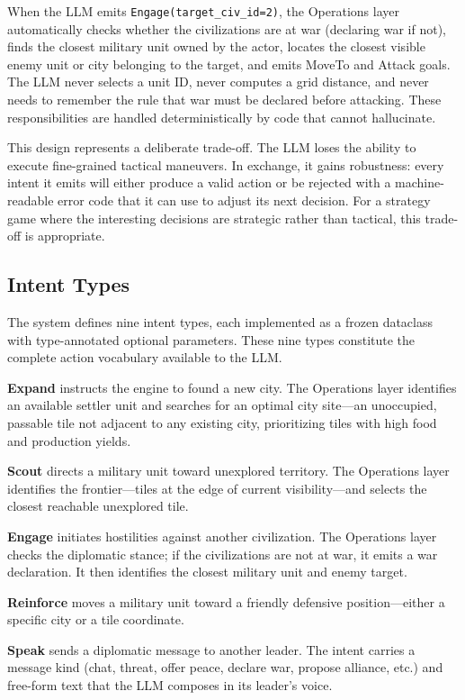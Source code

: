 \documentclass[conference]{IEEEtran}
\begin{document}
When the LLM emits \texttt{Engage(target\_civ\_id=2)}, the Operations layer
automatically checks whether the civilizations are at war (declaring war if
not), finds the closest military unit owned by the actor, locates the
closest visible enemy unit or city belonging to the target, and emits
MoveTo and Attack goals. The LLM never selects a unit ID, never computes a
grid distance, and never needs to remember the rule that war must be
declared before attacking. These responsibilities are handled
deterministically by code that cannot hallucinate.

This design represents a deliberate trade-off. The LLM loses the ability to
execute fine-grained tactical maneuvers. In exchange, it gains robustness:
every intent it emits will either produce a valid action or be rejected
with a machine-readable error code that it can use to adjust its next
decision. For a strategy game where the interesting decisions are strategic
rather than tactical, this trade-off is appropriate.

\subsection{Intent Types}

The system defines nine intent types, each implemented as a frozen
dataclass with type-annotated optional parameters. These nine types
constitute the complete action vocabulary available to the LLM.

\textbf{Expand} instructs the engine to found a new city. The Operations
layer identifies an available settler unit and searches for an optimal city
site---an unoccupied, passable tile not adjacent to any existing city,
prioritizing tiles with high food and production yields.

\textbf{Scout} directs a military unit toward unexplored territory. The
Operations layer identifies the frontier---tiles at the edge of current
visibility---and selects the closest reachable unexplored tile.

\textbf{Engage} initiates hostilities against another civilization. The
Operations layer checks the diplomatic stance; if the civilizations are not
at war, it emits a war declaration. It then identifies the closest military
unit and enemy target.

\textbf{Reinforce} moves a military unit toward a friendly defensive
position---either a specific city or a tile coordinate.

\textbf{Speak} sends a diplomatic message to another leader. The intent
carries a message kind (chat, threat, offer peace, declare war, propose
alliance, etc.) and free-form text that the LLM composes in its leader's
voice.
\end{document}
